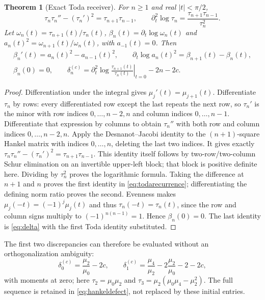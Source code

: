 \documentclass[11pt]{article}
\newtheorem{theorem}{Theorem}[section]
\begin{document}
\begin{theorem}[Exact Toda receiver]\label{thm:toda}
For $n\geq1$ and real $|t|<\pi/2$,
\begin{equation}\label{eq:toda}
 \tau_n\tau_n''-(\tau_n')^2=\tau_{n+1}\tau_{n-1},
 \qquad \partial_t^2\log\tau_n
                    =\frac{\tau_{n+1}\tau_{n-1}}{\tau_n^2}.
\end{equation}
Let $\omega_n(t)=\tau_{n+1}(t)/\tau_n(t)$,
$\beta_n(t)=\partial_t\log\omega_n(t)$ and
$a_n(t)^2=\omega_{n+1}(t)/\omega_n(t)$, with $a_{-1}(t)=0$.
Then
\begin{equation}\label{eq:todarecurrence}
 \begin{gathered}
 \beta_n'(t)=a_n(t)^2-a_{n-1}(t)^2,\qquad
 \partial_t\log a_n(t)^2=\beta_{n+1}(t)-\beta_n(t),\\
 \beta_n(0)=0,\qquad
 \delta_n^{(c)}
   =\left.\partial_t^2\log\frac{\tau_{n+1}(t)}{\tau_n(t)}
                                               \right|_{t=0}-2n-2c .
 \end{gathered}
\end{equation}
\end{theorem}
\begin{proof}
Differentiation under the integral gives
$\mu_j'(t)=\mu_{j+1}(t)$. Differentiate $\tau_n$ by rows:
every differentiated row except the last repeats the next
row, so $\tau_n'$ is the minor with row indices
$0,\ldots,n-2,n$ and column indices $0,\ldots,n-1$.
Differentiate that expression by columns to obtain
$\tau_n''$ with both row and column indices
$0,\ldots,n-2,n$. Apply the Desnanot--Jacobi identity
to the $(n+1)$-square Hankel matrix with indices $0,\ldots,n$,
deleting the last two indices. It gives exactly
$\tau_n\tau_n''-(\tau_n')^2=\tau_{n+1}\tau_{n-1}$.
This identity itself follows by two-row/two-column
Schur elimination on an invertible upper-left block;
that block is positive definite here. Dividing by
$\tau_n^2$ proves the logarithmic formula.
Taking the difference at $n+1$ and $n$ proves the first
identity in \eqref{eq:todarecurrence}; differentiating
the defining norm ratio proves the second.
Evenness makes $\mu_j(-t)=(-1)^j\mu_j(t)$ and thus
$\tau_n(-t)=\tau_n(t)$, since the row and column signs
multiply to $(-1)^{n(n-1)}=1$. Hence $\beta_n(0)=0$.
The last identity is \eqref{eq:delta} with the first
Toda identity substituted.
\end{proof}

The first two discrepancies can therefore be evaluated
without an orthogonalization ambiguity:
\[
 \delta_0^{(c)}=\frac{\mu_2}{\mu_0}-2c,\qquad
 \delta_1^{(c)}=\frac{\mu_4}{\mu_2}
              -2\frac{\mu_2}{\mu_0}-2-2c,
\]
with moments at zero; here
$\tau_2=\mu_0\mu_2$ and
$\tau_3=\mu_2(\mu_0\mu_4-\mu_2^2)$.
The full sequence is retained in \eqref{eq:hankeldefect},
not replaced by these initial entries.
\end{document}
